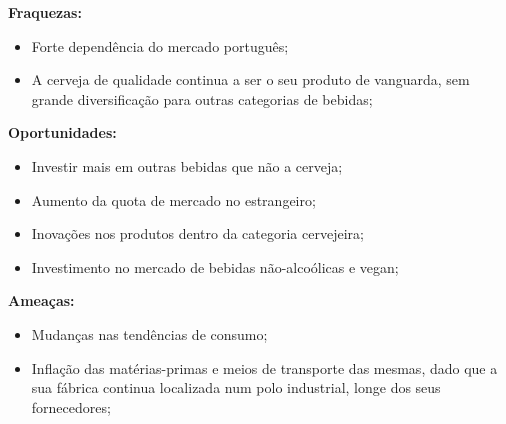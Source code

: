 \noindent \textbf{Fraquezas:} 
\begin{itemize}

\item Forte dependência do mercado português; 

\item A cerveja de qualidade continua a ser o seu produto de vanguarda, sem grande diversificação para outras categorias de bebidas; 
\end{itemize}

\noindent \textbf{Oportunidades:}

\begin{itemize}
\item Investir mais em outras bebidas que não a cerveja; 

\item Aumento da quota de mercado no estrangeiro; 

\item Inovações nos produtos dentro da categoria cervejeira; 

\item Investimento no mercado de bebidas não-alcoólicas e vegan; 
\end{itemize}

\noindent \textbf{Ameaças:}
\begin{itemize}
    
\item Mudanças nas tendências de consumo; 

\item Inflação das matérias-primas e meios de transporte das mesmas, dado que a sua fábrica continua localizada num polo industrial, longe dos seus fornecedores; 
\end{itemize}
